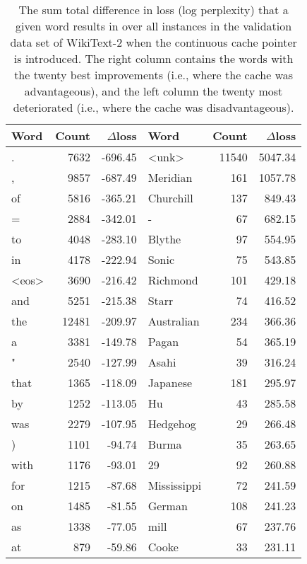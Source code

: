 \documentclass{article}
\begin{document}
\begin{table}
\begin{center}\small
\begin{tabular}{lrr|lrr}
\toprule[0.3ex]
Word & Count & $\Delta$loss & Word & Count & $\Delta$loss \\
 
\midrule[0.2ex]
. & 7632 & -696.45 & <unk> & 11540 & 5047.34 \\
, & 9857 & -687.49 & Meridian & 161 & 1057.78 \\
of & 5816 & -365.21 & Churchill & 137 & 849.43 \\
= & 2884 & -342.01 & - & 67 & 682.15 \\
to & 4048 & -283.10 & Blythe & 97 & 554.95 \\
in & 4178 & -222.94 & Sonic & 75 & 543.85 \\
<eos> & 3690 & -216.42 & Richmond & 101 & 429.18 \\
and & 5251 & -215.38 & Starr & 74 & 416.52 \\
the & 12481 & -209.97 & Australian & 234 & 366.36 \\
a & 3381 & -149.78 & Pagan & 54 & 365.19 \\
" & 2540 & -127.99 & Asahi & 39 & 316.24 \\
that & 1365 & -118.09 & Japanese & 181 & 295.97 \\
by & 1252 & -113.05 & Hu & 43 & 285.58 \\
was & 2279 & -107.95 & Hedgehog & 29 & 266.48 \\
) & 1101 & -94.74 & Burma & 35 & 263.65 \\
with & 1176 & -93.01 & 29 & 92 & 260.88 \\
for & 1215 & -87.68 & Mississippi & 72 & 241.59 \\
on & 1485 & -81.55 & German & 108 & 241.23 \\
as & 1338 & -77.05 & mill & 67 & 237.76 \\
at & 879 & -59.86 & Cooke & 33 & 231.11 \\
\bottomrule[0.3ex]
\end{tabular}
\end{center}
\caption{
The sum total difference in loss (log perplexity) that a given word results in over all instances in the validation data set of WikiText-2 when the continuous cache pointer is introduced. The right column contains the words with the twenty best improvements (i.e., where the cache was advantageous), and the left column the twenty most deteriorated (i.e., where the cache was disadvantageous).}
\label{tb:ptranalysis}
\end{table}
\end{document}
